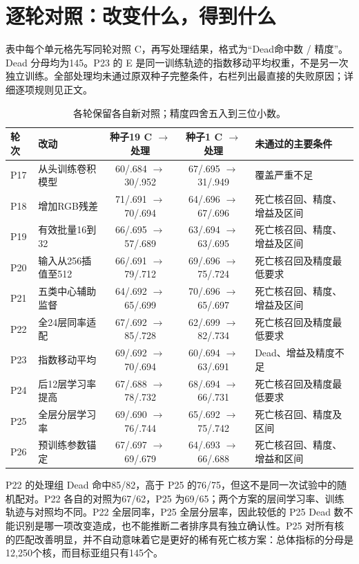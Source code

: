 \appendix
\section{逐轮对照：改变什么，得到什么}
表中每个单元格先写同轮对照 C，再写处理结果，格式为“Dead命中数 / 精度”。Dead 分母均为145。P23 的 E 是同一训练轨迹的指数移动平均权重，不是另一次独立训练。全部处理均未通过原双种子完整条件，右栏列出最直接的失败原因；详细逐项规则见正文。
\begin{table}[H]\centering\small
\begin{tabularx}{\linewidth}{lXccX}\toprule
轮次 & 改动 & 种子19 C $\to$ 处理 & 种子1 C $\to$ 处理 & 未通过的主要条件\\\midrule
P17 & 从头训练卷积模型 & 60/.684 $\to$ 30/.952 & 67/.695 $\to$ 31/.949 & 覆盖严重不足\\
P18 & 增加RGB残差 & 71/.691 $\to$ 70/.694 & 64/.696 $\to$ 67/.696 & 死亡核召回、精度、增益及区间\\
P19 & 有效批量16到32 & 66/.695 $\to$ 57/.689 & 63/.694 $\to$ 63/.695 & 死亡核召回、精度、增益及区间\\
P20 & 输入从256插值至512 & 66/.691 $\to$ 79/.712 & 69/.696 $\to$ 75/.724 & 死亡核召回及精度最低要求\\
P21 & 五类中心辅助监督 & 64/.692 $\to$ 65/.699 & 70/.696 $\to$ 65/.697 & 死亡核召回、精度、增益及区间\\
P22 & 全24层同率适配 & 67/.692 $\to$ 85/.728 & 62/.699 $\to$ 82/.734 & 死亡核召回及精度最低要求\\
P23 & 指数移动平均 & 69/.692 $\to$ 70/.694 & 60/.694 $\to$ 63/.691 & Dead、增益及精度不足\\
P24 & 后12层学习率提高 & 67/.688 $\to$ 78/.732 & 68/.694 $\to$ 66/.731 & 死亡核召回及精度最低要求\\
P25 & 全层分层学习率 & 69/.690 $\to$ 76/.744 & 65/.692 $\to$ 75/.742 & 死亡核召回、精度及区间\\P26 & 预训练参数锚定 & 67/.697 $\to$ 69/.679 & 64/.693 $\to$ 66/.688 & 死亡核召回、精度、增益和区间\\\bottomrule
\end{tabularx}\caption{各轮保留各自新对照；精度四舍五入到三位小数。}\end{table}

P22 的处理组 Dead 命中85/82，高于 P25 的76/75，但这不是同一次试验中的随机配对。P22 各自的对照为67/62，P25 为69/65；两个方案的层间学习率、训练轨迹与对照均不同。P22 全层同率，P25 全层分层率，因此较低的 P25 Dead 数不能识别是哪一项改变造成，也不能推断二者排序具有独立确认性。P25 对所有核的匹配改善明显，并不自动意味着它是更好的稀有死亡核方案：总体指标的分母是12,250个核，而目标亚组只有145个。


